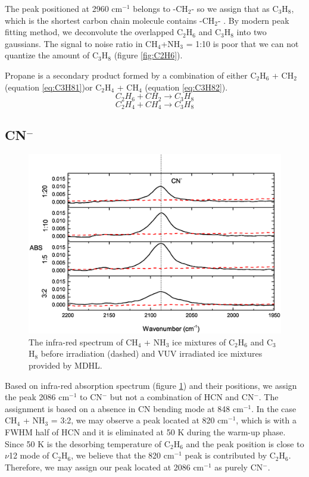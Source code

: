 The peak positioned at 2960 cm$^{-1}$ belongs to -CH$_2$- so we assign that as C$_3$H$_8$, which is the shortest carbon chain molecule contains -CH$_2$- . By modern peak fitting method, we deconvolute the overlapped C$_2$H$_6$ and C$_3$H$_8$ into two gaussians. The signal to noise ratio in CH$_4$+NH$_3$ = 1:10 is poor that we can not quantize the amount of C$_3$H$_8$ (figure \ref{fig:C2H6}).

Propane is a secondary product formed by a combination of either C$_2$H$_6$ + CH$_2$ (equation \ref{eq:C3H81})or C$_2$H$_4$ + CH$_4$ (equation \ref{eq:C3H82}).
\begin{equation}
C_2H_6 + CH_2 \rightarrow C_3H_8
\label{eq:C3H81}
\end{equation}
\begin{equation}
C_2H_4 + CH_4 \rightarrow C_3H_8
\label{eq:C3H82}
\end{equation}

\subsection{CN$^-$}

\begin{figure}
\centering
\includegraphics[width=\textwidth]{figures/chapter3/CN.eps}
\caption{The infra-red spectrum of CH$_4$ + NH$_3$ ice mixtures of C$_2$H$_6$ and C$_3$H$_8$ before irradiation (dashed) and VUV irradiated ice mixtures provided by MDHL. }
\label{fig:CN}
\end{figure}

Based on infra-red absorption spectrum (figure \ref{fig:CN}) and their positions, we assign the peak 2086 cm$^{-1}$ to CN$^-$  but not a combination of HCN and CN$^-$. The assignment is based on a absence in CN bending mode at 848 cm$^{-1}$. In the case CH$_4$ + NH$_3$ = 3:2, we may observe a peak located at 820 cm$^{-1}$, which is with a FWHM half of HCN and it is eliminated at 50 K during the warm-up phase. Since 50 K is the desorbing temperature of C$_2$H$_6$ and the peak position is close to $\nu$12 mode of C$_2$H$_6$, we believe that the 820 cm$^{-1}$ peak is contributed by C$_2$H$_6$. Therefore, we may assign our peak located at 2086 cm$^{-1}$ as purely CN$^-$.\\

